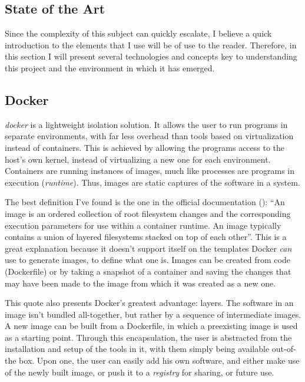 \documentclass[11pt]{article}
\begin{document}
\begin{flushleft}
\clearpage
\section{State of the Art}
Since the complexity of this subject can quickly escalate, I believe a quick introduction to the elements that I use will be of use to the reader. Therefore, in this section I will present several technologies and concepts key to understanding this project and the environment in which it has emerged.

\bigskip
\bigskip

    \subsection{Docker}
    \textit{\gls{docker}} is a lightweight isolation solution. It allows the user to run programs in separate environments, with far less overhead than tools based on virtualization instead of containers. This is achieved by allowing the programs access to the host's own kernel, instead of virtualizing a new one for each environment. Containers are running instances of images, much like processes are programs in execution (\textit{\gls{runtime}}). Thus, images are static captures of the software in a system. 
    \linebreak

    The best definition I've found is the one in the official documentation (\cite{dockergls}): ``An image is an ordered collection of root filesystem changes and the corresponding execution parameters for use within a container runtime. An image typically contains a union of layered filesystems stacked on top of each other''. This is a great explanation because it doesn't support itself on the templates Docker \emph{can} use to generate images, to define what one is. Images can be created from code (Dockerfile) or by taking a snapshot of a container and saving the changes that may have been made to the image from which it was created as a new one.
    \linebreak

    This quote also presents Docker's greatest advantage: layers. The software in an image isn't bundled all-together, but rather by a sequence of intermediate images. A new image can be built from a Dockerfile, in which a preexisting image is used as a starting point. Through this encapsulation, the user is abstracted from the installation and setup of the tools in it, with them simply being available out-of-the box. Upon one, the user can easily add his own software, and either make use of the newly built image, or push it to a \textit{\gls{registry}} for sharing, or future use. 
    \linebreak


\end{flushleft}
\end{document}
